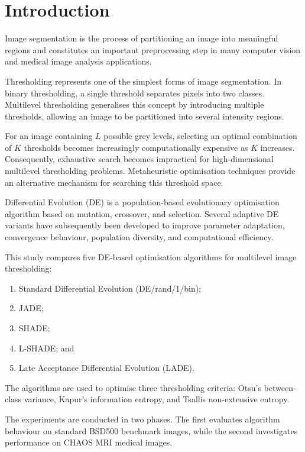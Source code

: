 \documentclass[review]{elsarticle}
\begin{document}


\section{Introduction}
\label{sec:introduction}

Image segmentation is the process of partitioning an image into
meaningful regions and constitutes an important preprocessing step in
many computer vision and medical image analysis applications.

Thresholding represents one of the simplest forms of image segmentation.
In binary thresholding, a single threshold separates pixels into two
classes. Multilevel thresholding generalises this concept by introducing
multiple thresholds, allowing an image to be partitioned into several
intensity regions.

For an image containing $L$ possible grey levels, selecting an optimal
combination of $K$ thresholds becomes increasingly computationally
expensive as $K$ increases. Consequently, exhaustive search becomes
impractical for high-dimensional multilevel thresholding problems.
Metaheuristic optimisation techniques provide an alternative mechanism
for searching this threshold space.

Differential Evolution (DE) is a population-based evolutionary
optimisation algorithm based on mutation, crossover, and selection.
Several adaptive DE variants have subsequently been developed to improve
parameter adaptation, convergence behaviour, population diversity, and
computational efficiency.

This study compares five DE-based optimisation algorithms for multilevel
image thresholding:

\begin{enumerate}
    \item Standard Differential Evolution (DE/rand/1/bin);
    \item JADE;
    \item SHADE;
    \item L-SHADE; and
    \item Late Acceptance Differential Evolution (LADE).
\end{enumerate}

The algorithms are used to optimise three thresholding criteria:
Otsu's between-class variance, Kapur's information entropy, and
Tsallis non-extensive entropy.

The experiments are conducted in two phases. The first evaluates
algorithm behaviour on standard BSD500 benchmark images, while the
second investigates performance on CHAOS MRI medical images.
\end{document}
